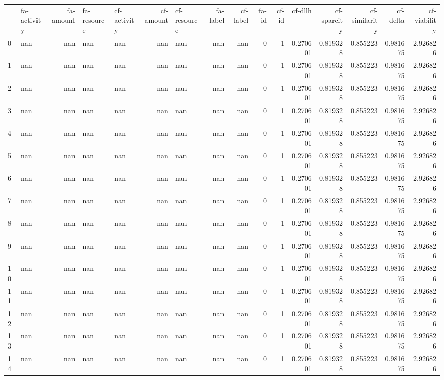 \begin{tabular}{llrllrlrrrrrrrrr}
 & fa-activity & fa-amount & fa-resource & cf-activity & cf-amount & cf-resource & fa-label & cf-label & fa-id & cf-id & cf-dllh & cf-sparcity & cf-similarity & cf-delta & cf-viability \\
0 & nan & nan & nan & nan & nan & nan & nan & nan & 0 & 1 & 0.270601 & 0.819328 & 0.855223 & 0.981675 & 2.926826 \\
1 & nan & nan & nan & nan & nan & nan & nan & nan & 0 & 1 & 0.270601 & 0.819328 & 0.855223 & 0.981675 & 2.926826 \\
2 & nan & nan & nan & nan & nan & nan & nan & nan & 0 & 1 & 0.270601 & 0.819328 & 0.855223 & 0.981675 & 2.926826 \\
3 & nan & nan & nan & nan & nan & nan & nan & nan & 0 & 1 & 0.270601 & 0.819328 & 0.855223 & 0.981675 & 2.926826 \\
4 & nan & nan & nan & nan & nan & nan & nan & nan & 0 & 1 & 0.270601 & 0.819328 & 0.855223 & 0.981675 & 2.926826 \\
5 & nan & nan & nan & nan & nan & nan & nan & nan & 0 & 1 & 0.270601 & 0.819328 & 0.855223 & 0.981675 & 2.926826 \\
6 & nan & nan & nan & nan & nan & nan & nan & nan & 0 & 1 & 0.270601 & 0.819328 & 0.855223 & 0.981675 & 2.926826 \\
7 & nan & nan & nan & nan & nan & nan & nan & nan & 0 & 1 & 0.270601 & 0.819328 & 0.855223 & 0.981675 & 2.926826 \\
8 & nan & nan & nan & nan & nan & nan & nan & nan & 0 & 1 & 0.270601 & 0.819328 & 0.855223 & 0.981675 & 2.926826 \\
9 & nan & nan & nan & nan & nan & nan & nan & nan & 0 & 1 & 0.270601 & 0.819328 & 0.855223 & 0.981675 & 2.926826 \\
10 & nan & nan & nan & nan & nan & nan & nan & nan & 0 & 1 & 0.270601 & 0.819328 & 0.855223 & 0.981675 & 2.926826 \\
11 & nan & nan & nan & nan & nan & nan & nan & nan & 0 & 1 & 0.270601 & 0.819328 & 0.855223 & 0.981675 & 2.926826 \\
12 & nan & nan & nan & nan & nan & nan & nan & nan & 0 & 1 & 0.270601 & 0.819328 & 0.855223 & 0.981675 & 2.926826 \\
13 & nan & nan & nan & nan & nan & nan & nan & nan & 0 & 1 & 0.270601 & 0.819328 & 0.855223 & 0.981675 & 2.926826 \\
14 & nan & nan & nan & nan & nan & nan & nan & nan & 0 & 1 & 0.270601 & 0.819328 & 0.855223 & 0.981675 & 2.926826 \\

\end{tabular}
